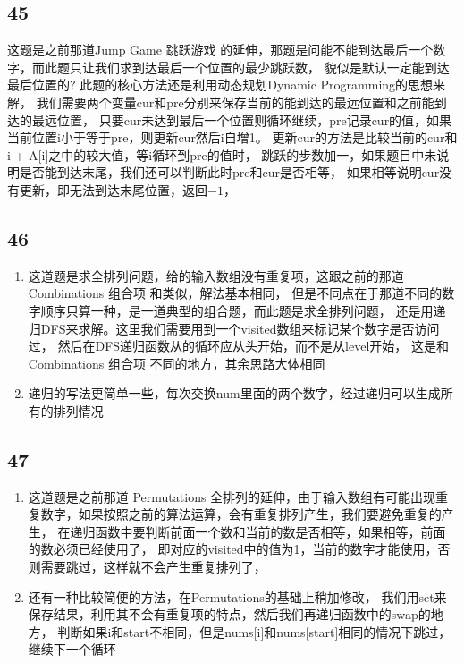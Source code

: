 \documentclass[12pt,a4paper]{article}
\begin{document}
\subsection{45}
\begin{CJK}{UTF8}{gbsn}
这题是之前那道Jump Game 跳跃游戏 的延伸，那题是问能不能到达最后一个数字，而此题只让我们求到达最后一个位置的最少跳跃数，
貌似是默认一定能到达最后位置的? 此题的核心方法还是利用动态规划Dynamic Programming的思想来解，
我们需要两个变量cur和pre分别来保存当前的能到达的最远位置和之前能到达的最远位置，
只要cur未达到最后一个位置则循环继续，pre记录cur的值，如果当前位置i小于等于pre，则更新cur然后i自增1。
更新cur的方法是比较当前的cur和i + A[i]之中的较大值，等i循环到pre的值时，
跳跃的步数加一，如果题目中未说明是否能到达末尾，我们还可以判断此时pre和cur是否相等，
如果相等说明cur没有更新，即无法到达末尾位置，返回$-1$，
\end{CJK}

\subsection{46}
\begin{enumerate}
\item
\begin{CJK}{UTF8}{gbsn}
这道题是求全排列问题，给的输入数组没有重复项，这跟之前的那道 Combinations 组合项 和类似，解法基本相同，
但是不同点在于那道不同的数字顺序只算一种，是一道典型的组合题，而此题是求全排列问题，
还是用递归DFS来求解。这里我们需要用到一个visited数组来标记某个数字是否访问过，
然后在DFS递归函数从的循环应从头开始，而不是从level开始，
这是和 Combinations 组合项 不同的地方，其余思路大体相同
\end{CJK}
\item
\begin{CJK}{UTF8}{gbsn}
递归的写法更简单一些，每次交换num里面的两个数字，经过递归可以生成所有的排列情况
\end{CJK}
\end{enumerate}

\subsection{47}
\begin{enumerate}
\item
\begin{CJK}{UTF8}{gbsn}
这道题是之前那道 Permutations 全排列的延伸，由于输入数组有可能出现重复数字，如果按照之前的算法运算，会有重复排列产生，我们要避免重复的产生，
在递归函数中要判断前面一个数和当前的数是否相等，如果相等，前面的数必须已经使用了，
即对应的visited中的值为1，当前的数字才能使用，否则需要跳过，这样就不会产生重复排列了，
\end{CJK}
\item
\begin{CJK}{UTF8}{gbsn}
还有一种比较简便的方法，在Permutations的基础上稍加修改，
我们用set来保存结果，利用其不会有重复项的特点，然后我们再递归函数中的swap的地方，
判断如果i和start不相同，但是nums[i]和nums[start]相同的情况下跳过，继续下一个循环
\end{CJK}
\end{enumerate}
\end{document}

